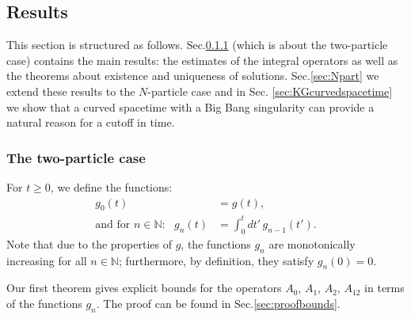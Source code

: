 \documentclass[b5paper,draft,openbib,12pt]{memoir}
\newcommand{\N}{\mathbb{N}}
\begin{document}
\subsection{Results}
\label{sec:results}

This section is structured as follows. Sec.\@ \ref{sec:2part} (which 
is about the two-particle case) contains the main results: the 
estimates of the integral operators as well as the theorems about 
existence and uniqueness of solutions. Sec.\@ \ref{sec:Npart} we 
extend these results to the $N$-particle case and in Sec.\@ 
\ref{sec:KGcurvedspacetime} we show that a curved spacetime with a 
Big Bang singularity can provide a natural reason for a cutoff in 
time.


\subsubsection{The two-particle case} \label{sec:2part}

For $t\geq0$, we define the functions:
\begin{align}
	g_0(t) &= g(t),\nonumber\\
\text{and for }n\in\N:~~~	g_n(t) &= \int_0^t dt' \, g_{n-1}(t').	
\end{align}
Note that due to the properties of $g$, the functions $g_n$ are 
monotonically increasing for all $n\in \N$; furthermore, by 
definition, they satisfy $g_n(0)=0$.

Our first theorem gives explicit bounds for the operators 
\(A_0\), \(A_1\), \(A_2\), \(A_{12}\) in terms of the functions $g_n$. 
The proof 
can be found in Sec.\@ \ref{sec:proofbounds}.
\end{document}
